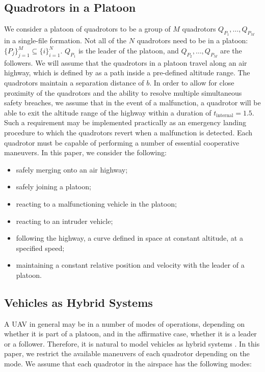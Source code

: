 \subsection{Quadrotors in a Platoon\label{subsec:platoon_def}}
We consider a platoon of quadrotors to be a group of $M$ quadrotors $Q_{P_1}, \ldots, Q_{P_M}$ in a single-file formation. Not all of the $N$ quadrotors need to be in a platoon: $\{P_j\}_{j=1}^M \subseteq \{i\}_{i=1}^N$. $Q_{P_1}$ is the leader of the platoon, and $Q_{P_2},\ldots,Q_{P_M}$ are the followers. We will assume that the quadrotors in a platoon travel along an air highway, which is defined by as a path inside a pre-defined altitude range. The quadrotors maintain a separation distance of $b$. In order to allow for close proximity of the quadrotors and the ability to resolve multiple simultaneous safety breaches, we assume that in the event of a malfunction, a quadrotor will be able to exit the altitude range of the highway within a duration of $t_\text{internal}=1.5$. Such a requirement may be implemented practically as an emergency landing procedure to which the quadrotors revert when a malfunction is detected. Each quadrotor must be capable of performing a number of essential cooperative maneuvers. In this paper, we consider the following: 
\begin{itemize}
\item safely merging onto an air highway;
\item safely joining a platoon;
\item reacting to a malfunctioning vehicle in the platoon;
\item reacting to an intruder vehicle;
\item following the highway, a curve defined in space at constant altitude, at a specified speed;
\item maintaining a constant relative position and velocity with the leader of a platoon.
\end{itemize}

\subsection{Vehicles as Hybrid Systems}
A UAV in general may be in a number of modes of operations, depending on whether it is part of a platoon, and in the affirmative case, whether it is a leader or a follower. Therefore, it is natural to model vehicles as hybrid systems \cite{Lygeros98,Lygeros12}. In this paper, we restrict the available maneuvers of each quadrotor depending on the mode. We assume that each quadrotor in the airspace has the following modes:

